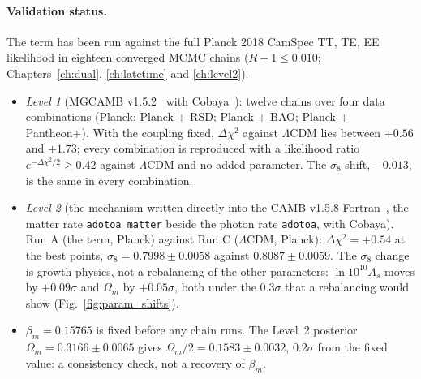 \paragraph{Validation status.} The term has been run against the full Planck 2018 CamSpec TT, TE, EE likelihood in eighteen converged MCMC chains
($R-1\le0.010$; Chapters~\ref{ch:dual}, \ref{ch:latetime} and \ref{ch:level2}). \measured
\begin{itemize}
\item \emph{Level 1} (MGCAMB v1.5.2~\cite{Wang2023MGCAMB} with Cobaya~\cite{Torrado2021}): twelve chains over four data combinations (Planck; Planck +
RSD; Planck + BAO; Planck + Pantheon+). With the coupling fixed, $\Delta\chi^2$ against $\Lambda$CDM lies between $+0.56$ and $+1.73$; every combination is
reproduced with a likelihood ratio $e^{-\Delta\chi^2/2}\ge0.42$ against $\Lambda$CDM and no added parameter. The $\sigma_8$ shift, $-0.013$, is the same in every combination. \measured
\item \emph{Level 2} (the mechanism written directly into the CAMB v1.5.8 Fortran~\cite{Lewis2000CAMB}, the matter rate \texttt{adotoa\_matter} beside
the photon rate \texttt{adotoa}, with Cobaya). Run A (the term, Planck) against Run C ($\Lambda$CDM, Planck): $\Delta\chi^2=+0.54$ at the best points,
$\sigma_8=0.7998\pm0.0058$ against $0.8087\pm0.0059$. The $\sigma_8$ change is growth physics, not a rebalancing of the other parameters:
$\ln10^{10}A_s$ moves by $+0.09\sigma$ and $\Omega_m$ by $+0.05\sigma$, both under the $0.3\sigma$ that a rebalancing would show
(Fig.~\ref{fig:param_shifts}). \measured
\item $\beta_m=0.15765$ is fixed before any chain runs. The Level~2 posterior $\Omega_m=0.3166\pm0.0065$ gives $\Omega_m/2=0.1583\pm0.0032$, $0.2\sigma$
from the fixed value: a consistency check, not a recovery of $\beta_m$. \calc
\end{itemize}
